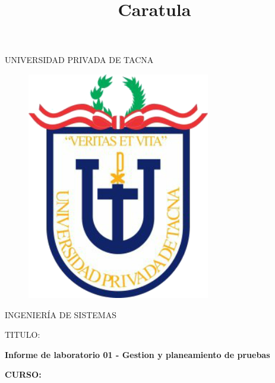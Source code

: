 \documentclass[12pt,letterpaper]{article}
\begin{document}
%


\title{Caratula}

\begin{titlepage}
\begin{center}
\large{UNIVERSIDAD PRIVADA DE TACNA}\\
\vspace*{-0.025in}
\begin{figure}[htb]
\begin{center}
\includegraphics[width=8cm]{./Imagenes/logo}
\end{center}
\end{figure}
\vspace*{0.15in}
INGENIERÍA DE SISTEMAS  \\

\vspace*{0.5in}
\begin{large}
TITULO:\\
\end{large}

\vspace*{0.1in}
\begin{Large}
\textbf{Informe de laboratorio 01 - Gestion y planeamiento de pruebas} \\
\end{Large}

\vspace*{0.3in}
\begin{Large}
\textbf{CURSO:} \\
\end{Large}


\end{center}
\end{titlepage}
\end{document}
